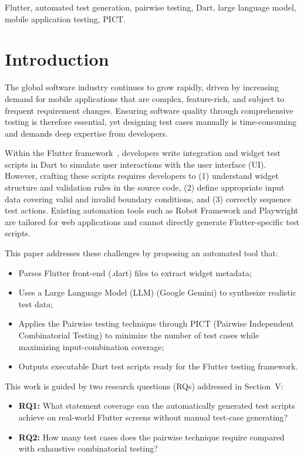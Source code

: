 \documentclass[conference]{IEEEtran}
\renewcommand{\texttt}[1]{\textnormal{#1}}
\begin{document}
\begin{IEEEkeywords}
Flutter, automated test generation, pairwise testing, Dart, large language
model, mobile application testing, PICT.
\end{IEEEkeywords}

\section{Introduction}

The global software industry continues to grow rapidly, driven by increasing
demand for mobile applications that are complex, feature-rich, and subject to
frequent requirement changes. Ensuring software quality through comprehensive
testing is therefore essential, yet designing test cases manually is
time-consuming and demands deep expertise from developers.

Within the Flutter framework~\cite{b1}, developers write integration and
widget test scripts in Dart to simulate user interactions with the user interface (UI). However,
crafting these scripts requires developers to (1) understand widget structure
and validation rules in the source code, (2) define appropriate input data
covering valid and invalid boundary conditions, and (3) correctly sequence test actions. Existing automation tools such as Robot Framework and Playwright
are tailored for web applications and cannot directly generate Flutter-specific
test scripts.

This paper addresses these challenges by proposing an automated tool that:
\begin{itemize}
  \item Parses Flutter front-end (\texttt{.dart}) files to extract widget
        metadata;
  \item Uses a Large Language Model (LLM) (Google Gemini) to synthesize realistic test data;
  \item Applies the Pairwise testing technique through PICT (Pairwise
        Independent Combinatorial Testing) to minimize the
        number of test cases while maximizing input-combination coverage;
  \item Outputs executable Dart test scripts ready for the Flutter testing
        framework.
\end{itemize}

This work is guided by two research questions (RQs) addressed in
Section~V:
\begin{itemize}
  \item \textbf{RQ1:} What statement coverage can the automatically
        generated test scripts achieve on real-world Flutter screens
        without manual test-case generating?
  \item \textbf{RQ2:} How many test cases does the pairwise technique
        require compared with exhaustive combinatorial testing?
\end{itemize}
\end{document}

